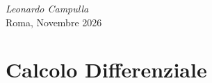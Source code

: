 \documentclass[a4paper, 10pt, openany]{book}
\begin{document}
\vspace{1cm}
\begin{flushright}
    \textit{Leonardo Campulla} \\
    {\footnotesize\color{fglight!60} Roma, Novembre 2026}
\end{flushright}
\tableofcontents

\mainmatter
\chapter{Calcolo Differenziale}


% 
\end{document}
